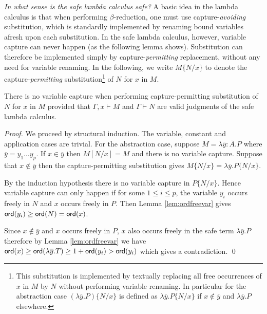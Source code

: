 \documentclass{llncs}
\newcommand\subst[2]{\left[ #1/#2 \right]}
\newcommand\captsubst[2]{\{#1/#2 \}}
\begin{document}
\emph{In what sense is the safe lambda calculus safe?} A basic idea
in the lambda calculus is that when performing $\beta$-reduction, one
must use capture-\emph{avoiding} substitution, which is standardly
implemented by renaming bound variables afresh upon each substitution.
In the safe lambda calculus, however, variable capture can never
happen (as the following lemma shows). Substitution can therefore be
implemented simply by capture-\emph{permitting} replacement, without
any need for variable renaming. In the following, we write
$M\captsubst{N}{x}$ to denote the capture-\emph{permitting}
substitution\footnote{This substitution is implemented by textually
  replacing all free occurrences of $x$ in $M$ by $N$ without
  performing variable renaming.  In particular for the abstraction
  case $(\lambda \overline{y} . P)\captsubst{N}{x}$ is defined as
  $\lambda \overline{y} . P\captsubst{N}{x}$ if $x\not\in
  \overline{y}$ and $\lambda \overline{y} . P$ elsewhere.} of $N$ for
$x$ in $M$.

\begin{lemma}\label{lem:nvc}
\label{lem:homog_nocapture} There is
no variable capture when performing capture-permitting
substitution of $N$ for $x$ in $M$
provided that $\Gamma, x \vdash M$ and $\Gamma \vdash  N$ are valid judgments of the safe lambda calculus.
\end{lemma}

\begin{proof}
  We proceed by structural induction. The variable, constant and
  application cases are trivial. For the abstraction case, suppose $M
  = \lambda \overline{y} : \overline{A}. P$ where $\overline{y} = y_1
  \ldots y_p$. If $x \in \overline{y}$ then $M \subst{N}{x} = M$ and
  there is no variable capture.  Suppose that $x \not\in \overline{y}$
  then the capture-permitting substitution gives $M \captsubst{N}{x} =
  \lambda \overline{y} . P \captsubst{N}{x}$.

  By the induction hypothesis there is no variable capture in $P
  \captsubst{N}{x}$.  Hence variable capture can only happen if for
  some $1 \leq i \leq p$, the variable $y_i$ occurs freely in $N$ and
  $x$ occurs freely in $P$. Then Lemma \ref{lem:ordfreevar} gives $
  {\sf ord}(y_i) \geq {\sf ord}(N) = {\sf ord}(x)$.

  Since $x \not \in \overline{y}$ and $x$ occurs freely in $P$, $x$
  also occurs freely in the safe term $\lambda \overline{y}. P$
  therefore by Lemma \ref{lem:ordfreevar} we have $ {\sf ord}(x) \geq
  {\sf ord}(\lambda \overline{y} . T) \geq 1+ {\sf ord}(y_i) > {\sf ord}(y_i)$ which
  gives a contradiction. \qed
\end{proof}
\end{document}
